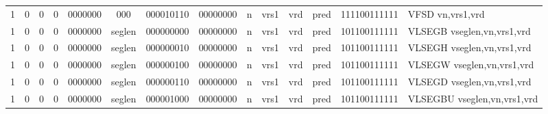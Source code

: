 \begin{landscape}
\begin{table}[p]
\begin{small}
\begin{center}
\begin{tabular}{p{0.08in}@{}p{0.08in}@{}p{0.08in}@{}p{0.08in}@{}p{0.50in}@{}p{0.30in}@{}p{0.08in}@{}p{0.8in}@{}p{0.48in}@{}p{0.32in}@{}p{0.08in}@{}p{0.8in}@{}p{0.8in}@{}p{0.4in}@{}p{0.56in}l}
\multicolumn{1}{|c|}{1} &
\multicolumn{1}{c|}{0} &
\multicolumn{1}{c|}{0} &
\multicolumn{1}{c|}{0} &
\multicolumn{1}{c|}{0000000} &
\multicolumn{1}{c|}{000} &
\multicolumn{2}{c|}{000010110} &
\multicolumn{2}{c|}{00000000} &
\multicolumn{1}{c|}{n} &
\multicolumn{1}{c|}{vrs1} &
\multicolumn{1}{c|}{vrd} &
\multicolumn{1}{c|}{pred} &
\multicolumn{1}{c|}{111100111111} & VFSD vn,vrs1,vrd \\
\cline{1-15}
  

\multicolumn{1}{|c|}{1} &
\multicolumn{1}{c|}{0} &
\multicolumn{1}{c|}{0} &
\multicolumn{1}{c|}{0} &
\multicolumn{1}{c|}{0000000} &
\multicolumn{1}{c|}{seglen} &
\multicolumn{2}{c|}{000000000} &
\multicolumn{2}{c|}{00000000} &
\multicolumn{1}{c|}{n} &
\multicolumn{1}{c|}{vrs1} &
\multicolumn{1}{c|}{vrd} &
\multicolumn{1}{c|}{pred} &
\multicolumn{1}{c|}{101100111111} & VLSEGB vseglen,vn,vrs1,vrd \\
\cline{1-15}
  

\multicolumn{1}{|c|}{1} &
\multicolumn{1}{c|}{0} &
\multicolumn{1}{c|}{0} &
\multicolumn{1}{c|}{0} &
\multicolumn{1}{c|}{0000000} &
\multicolumn{1}{c|}{seglen} &
\multicolumn{2}{c|}{000000010} &
\multicolumn{2}{c|}{00000000} &
\multicolumn{1}{c|}{n} &
\multicolumn{1}{c|}{vrs1} &
\multicolumn{1}{c|}{vrd} &
\multicolumn{1}{c|}{pred} &
\multicolumn{1}{c|}{101100111111} & VLSEGH vseglen,vn,vrs1,vrd \\
\cline{1-15}
  

\multicolumn{1}{|c|}{1} &
\multicolumn{1}{c|}{0} &
\multicolumn{1}{c|}{0} &
\multicolumn{1}{c|}{0} &
\multicolumn{1}{c|}{0000000} &
\multicolumn{1}{c|}{seglen} &
\multicolumn{2}{c|}{000000100} &
\multicolumn{2}{c|}{00000000} &
\multicolumn{1}{c|}{n} &
\multicolumn{1}{c|}{vrs1} &
\multicolumn{1}{c|}{vrd} &
\multicolumn{1}{c|}{pred} &
\multicolumn{1}{c|}{101100111111} & VLSEGW vseglen,vn,vrs1,vrd \\
\cline{1-15}
  

\multicolumn{1}{|c|}{1} &
\multicolumn{1}{c|}{0} &
\multicolumn{1}{c|}{0} &
\multicolumn{1}{c|}{0} &
\multicolumn{1}{c|}{0000000} &
\multicolumn{1}{c|}{seglen} &
\multicolumn{2}{c|}{000000110} &
\multicolumn{2}{c|}{00000000} &
\multicolumn{1}{c|}{n} &
\multicolumn{1}{c|}{vrs1} &
\multicolumn{1}{c|}{vrd} &
\multicolumn{1}{c|}{pred} &
\multicolumn{1}{c|}{101100111111} & VLSEGD vseglen,vn,vrs1,vrd \\
\cline{1-15}
  

\multicolumn{1}{|c|}{1} &
\multicolumn{1}{c|}{0} &
\multicolumn{1}{c|}{0} &
\multicolumn{1}{c|}{0} &
\multicolumn{1}{c|}{0000000} &
\multicolumn{1}{c|}{seglen} &
\multicolumn{2}{c|}{000001000} &
\multicolumn{2}{c|}{00000000} &
\multicolumn{1}{c|}{n} &
\multicolumn{1}{c|}{vrs1} &
\multicolumn{1}{c|}{vrd} &
\multicolumn{1}{c|}{pred} &
\multicolumn{1}{c|}{101100111111} & VLSEGBU vseglen,vn,vrs1,vrd \\
\cline{1-15}
  


\end{tabular}
\end{center}
\end{small}
\end{table}
\end{landscape}
